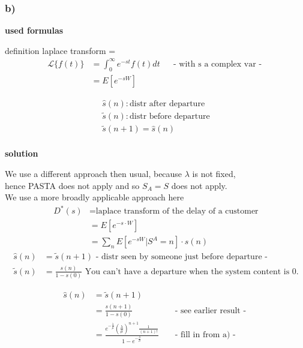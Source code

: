 \subsubsection*{ b) }

\textbf{used formulas}

definition laplace transform = 
\begin{align*}
\mathcal{L}\{f(t)\} &= \int_0^{\infty} e^{- s t} f(t) dt && \text{- with s a complex var - }\\
&= E[e^{- s W}]
\end{align*}

\begin{align*}
\hat{s}(n): \text{distr after departure}\\
\widetilde{s}(n): \text{distr before departure}\\
\widetilde{s}(n+1) = \hat{s}(n)\\
\end{align*}

\textbf{solution}

We use a different approach then usual, because $\lambda$ is not fixed,\\
hence PASTA does not apply and so $S_A = S$ does not apply.\\
We use a more broadly applicable approach here\\

\begin{align*}
D^{\ast }\left(s\right) &= \text{laplace transform of the delay of a customer}\\
&=E\left[e^{{-s\cdot W}}\right]\\
&=\sum _{n}E\left[e^{{-sW}}|S^{A}=n\right]\cdot \hat{s}\left(n\right)
\end{align*}
\begin{align*}
\hat{s}\left(n\right)&=\widetilde{s}\left(n+1\right) \text{ - distr seen by someone just before departure - }\\
\widetilde{s}\left(n\right)&=\frac{s\left(n\right)}{1-s\left(0\right)} \text{ You can't have a departure when the system content is 0.}
\end{align*}

\begin{align*}
\hat{s}\left(n\right)&=\widetilde{s}\left(n+1\right)\\
&=\frac{s\left(n+1\right)}{1-s\left(0\right)} && \text{ - see earlier result - }\\
&=\frac{e^{{-\frac{\lambda }{\mu }}}\left(\frac{\lambda }{\mu }\right)^{{n+1}}\frac{1}{\left(n+1\right)!}}{1-e^{{-\frac{\lambda }{\mu }}}} && \text{ - fill in from a) -}
\end{align*}

